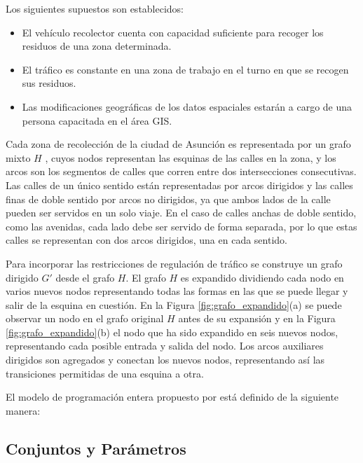 Los siguientes supuestos son establecidos:

\begin{itemize}
    \item El vehículo recolector cuenta con capacidad suficiente para recoger los residuos de una zona determinada.
    \item El tráfico es constante en una zona de trabajo en el turno en que se recogen sus residuos.
    \item Las modificaciones geográficas de los datos espaciales estarán a cargo de una persona capacitada en el área GIS.
\end{itemize}

Cada zona de recolección de la ciudad de Asunción es representada por un grafo mixto $H$ \citep{Braier2017AnArgentina}, cuyos nodos representan las esquinas de las calles en la zona, y los arcos son los segmentos de calles que corren entre dos intersecciones consecutivas. Las calles de un único sentido están representadas por arcos dirigidos y las calles finas de doble sentido por arcos no dirigidos, ya que ambos lados de la calle pueden ser servidos en un solo viaje. En el caso de calles anchas de doble sentido, como las avenidas, cada lado debe ser servido de forma separada, por lo que estas calles se representan con dos arcos dirigidos, una en cada sentido.

Para incorporar las restricciones de regulación de tráfico se construye un grafo dirigido $G'$ desde el grafo $H$. El grafo $H$ es expandido dividiendo cada nodo en varios nuevos nodos representando todas las formas en las que se puede llegar y salir de la esquina en cuestión. En la Figura \ref{fig:grafo_expandido}(a) se puede observar un nodo en el grafo original $H$ antes de su expansión y en la Figura \ref{fig:grafo_expandido}(b) el nodo que ha sido expandido en seis nuevos nodos, representando cada posible entrada y salida del nodo. Los arcos auxiliares dirigidos son agregados y conectan los nuevos nodos, representando así las transiciones permitidas de una esquina a otra.

El modelo de programación entera propuesto por \citet{Braier2017AnArgentina} está definido de la siguiente manera:

\subsection{Conjuntos y Parámetros}
\label{sec:conjunto-parametros}

